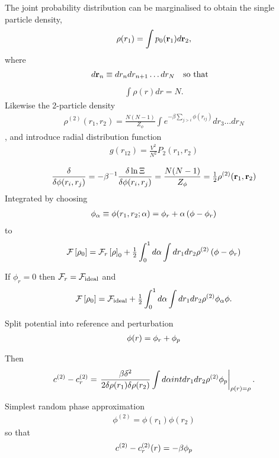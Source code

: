 {The joint probability distribution can be marginalised to obtain the single particle density,
\begin{align}
\rho(r_1) = \int p_0({\mathbf{\textbf{r}}}_1) d{\mathbf{\textbf{r}}}_2,
\end{align}
where 
\begin{align}
  d{\mathbf{\textbf{r}}}_n &\equiv dr_ndr_{n+1}\ldots dr_N \quad \text{so that}
\end{align}
\begin{align}
  \int \rho(r) dr = N.
\end{align}
Likewise the 2-particle density
\begin{align}
 \rho^{(2)}(r_1, r_2) = \frac{N(N-1)}{Z_\phi}\int e^{-\beta \sum_{j>i} \phi(r_{ij})}dr_3 \ldots dr_N
\end{align},
and introduce radial distribution function
\begin{align}
  g(r_{12}) = \frac{V^2}{N^2} P_2(r_1, r_2)
\end{align}


\begin{align}
\frac{  \delta}{\delta \phi(r_i, r_j) } = - \beta^{-1} \frac{\delta \ln \Xi}{\delta \phi(r_i, r_j)} = \frac{N(N-1)}{Z_\phi} = \tfrac{1}{2} \rho^{(2)}(\textbf{r}_1,\textbf{r}_2)
\end{align}
Integrated by choosing
\begin{align}
  \phi_\alpha \equiv \phi(r_1,r_2;\alpha) = \phi_r + \alpha \left( \phi - \phi_r \right)
\end{align}
to 
\begin{align}
  {\cal F}\left[ \rho_0 \right] = {\cal F}_r \left[ \rho \right]_0 + \tfrac{1}{2} \int_0^1d\alpha \int dr_1dr_2 \rho^{(2)}\left( \phi-\phi_r \right)
\end{align}

If $\phi_r = 0$ then ${\cal F}_r = {\cal F}_{\text{ideal}}$ and
\begin{align}
{\cal F}\left[ \rho_0 \right] = {\cal F}_{\text{ideal}} + \tfrac{1}{2} \int_0^1d\alpha \int dr_1dr_2 \rho^{(2)}\phi_\alpha \phi.
\end{align}

Split potential into reference and perturbation
\begin{align}
  \phi(r) = {\phi_r} + {\phi_p}
\end{align}

Then 
\begin{align}
c^{(2)} - c_r^{(2)} = \left.{\frac{\beta \delta^2}{2\delta \rho(r_1) \delta \rho(r_2)} \int d\alpha int dr_1 dr_2 \rho^{(2)} {\phi_p}}\right|_{\rho(r) = \rho}.
\end{align}

Simplest random phase approximation 
\begin{align}
  \phi^{(2)}  = \phi(r_1) \phi (r_2)
\end{align}
so that
\begin{align}
c^{(2)} - c_r^{(2)}(r) = -\beta {\phi_p}
\end{align}

}
